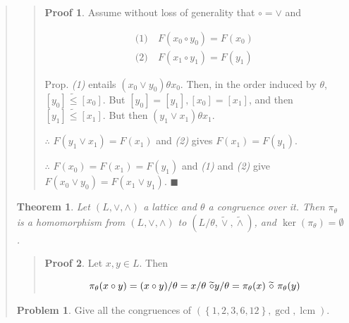 \documentclass[a4paper, 12pt]{article}
\newtheorem{theorem}{Theorem}
\theoremstyle{definition}
\newtheorem{problem}{Problem}
\theoremstyle{definition}
\theoremstyle{definition}
\newtheorem{pro}{Proof}
\DeclareMathOperator{\lcm}{lcm}
\DeclareMathOperator{\ker}{ker}
\begin{document}
\begin{quote}
\begin{quote}
\begin{pro}
Assume without loss of generality that $\circ = \lor$ and 

\begin{align*}
    \textit{(1)} ~ &F(x_0 \circ y_0) = F(x_0)\\
    \textit{(2)} ~ &F(x_1 \circ y_1) = F( y_1 )
\end{align*}

Prop. \textit{(1)} entails $(x_0 \lor y_0)\theta x_0$. Then, in the order
induced by $\theta$, $[y_0] \tilde{ \leq } [x_0]$. But $[y_0] = [y_1], [x_0] =
[x_1]$, and then $[y_1] \tilde{ \leq } [x_1]$. But then $(y_1 \lor x_1)\theta
x_1$. 

$\therefore $ $F(y_1 \lor  x_1) = F(x_1)$ and \textit{(2)} gives $F(x_1) = F(y_1)$.

$\therefore $ $F(x_0) = F(x_1) = F(y_1)$ and \textit{(1)} and \textit{(2)} give 
$F(x_0 \lor  y_0) = F(x_1 \lor  y_1)$. $\blacksquare$

\end{pro}

\end{quote}
\normalsize

\begin{theorem}
    Let $(L, \lor , \land )$ a lattice and $\theta$ a congruence over it. 
    Then $\pi_{\theta}$ is a homomorphism from $(L, \lor , \land )$ to 
    $(L / \theta, \widetilde{ \lor  }, \widetilde{ \land  } ) $, and 
    $\ker(\pi_{\theta}) = \emptyset$.
\end{theorem}


\small
\begin{quote}

    \begin{pro}
        
Let $x, y \in L$. Then 

\begin{equation*}
    \pi_{\theta}(x \circ  y) = (x \circ y) / \theta
                            = x / \theta ~ \widetilde{ \circ }  y / \theta\\ 
                            = \pi_{\theta}(x) ~ \widetilde{ \circ }  ~ \pi_{\theta}(y)
\end{equation*}
    \end{pro}


\end{quote}
\normalsize

\begin{problem}
    Give all the congruences of $(\left\{ 1, 2, 3, 6, 12 \right\}, \gcd, \lcm )$.
\end{problem}



\end{quote}
\end{document}

